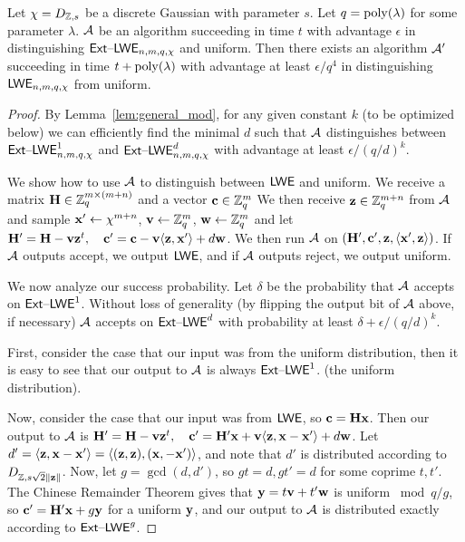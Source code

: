 \begin{theorem}\label{thm:main_new_extlwe}Let $\chi=D_{\mathbb{Z},s}$ be a
  discrete Gaussian with parameter $s$. Let $q=\operatorname{poly}(\lambda)$ for
  some parameter $\lambda$.
  $\mathcal{A}$ be an algorithm succeeding in time $t$ with advantage $\epsilon$ in
  distinguishing $\mathsf{Ext \text{\textendash} LWE}_{n,m,q,\chi}$ and uniform. Then there exists an algorithm
  $\mathcal{A}'$ succeeding in time $t+\operatorname{poly}(\lambda)$ with advantage at
  least $\epsilon/q^4$ in distinguishing $\mathsf{LWE}_{n,m,q,\chi}$ from uniform.
\end{theorem}
\begin{proof}
  By Lemma~\ref{lem:general_mod}, for any given constant $k$ (to be optimized below) we can efficiently find the minimal $d$ such
  that $\mathcal{A}$ distinguishes between $\mathsf{Ext \text{\textendash} LWE}_{n,m,q,\chi}^{1}$ and
  $\mathsf{Ext \text{\textendash} LWE}_{n,m,q,\chi}^{d}$ with advantage at least
  $\epsilon/(q/d)^k$. 

  We show how to use $\mathcal{A}$ to distinguish between $\mathsf{LWE}$ and
  uniform.  We receive a matrix $\mathbf{H} \in \mathbb{Z}_q^{m \times (m+n)}$
  and a vector $\mathbf{c} \in \mathbb{Z}_q^{m}$  We then
  receive $\mathbf{z} \in \mathbb{Z}_q^{m+n}$ from $\mathcal{A}$ and sample
  $\mathbf{x}' \gets \chi^{m+n}$, $\mathbf{v} \gets \mathbb{Z}_q^{m}$,
  $\mathbf{w} \gets \mathbb{Z}_q^{m}$ and let $\mathbf{H}' = \mathbf{H} - \mathbf{v}\mathbf{z}^t,\quad \mathbf{c}' = \mathbf{c} -
\mathbf{v}\langle\mathbf{z},\mathbf{x}'\rangle+d\mathbf{w}$. We then run $\mathcal{A}$ on $(\mathbf{H}',
\mathbf{c}',\mathbf{z},\langle\mathbf{x}',\mathbf{z}\rangle)$. If $\mathcal{A}$ outputs accept, we output
$\mathsf{LWE}$, and if $\mathcal{A}$ outputs reject, we output uniform.


We now analyze our success probability. Let $\delta$ be the
probability that $\mathcal{A}$ accepts on $\mathsf{Ext \text{\textendash} LWE}^{1}$.  Without loss of
generality (by flipping the output bit of $\mathcal{A}$ above, if necessary) $\mathcal{A}$ accepts
on $\mathsf{Ext \text{\textendash} LWE}^{d}$ with probability at least $\delta+\epsilon/(q/d)^k$.

First, consider the case that our input was from the uniform distribution, then it is easy
to see that our output to $\mathcal{A}$ is always $\mathsf{Ext \text{\textendash} LWE}^{1}$. (the uniform
distribution).


Now, consider the case that our input was from $\mathsf{LWE}$, so $\mathbf{c}=\mathbf{H}\mathbf{x}$. Then our output
to $\mathcal{A}$ is 
$\mathbf{H}'=\mathbf{H}-\mathbf{v}\mathbf{z}^t,\quad \mathbf{c}'=\mathbf{H}'\mathbf{x}+\mathbf{v}\langle\mathbf{z},\mathbf{x}-\mathbf{x}'\rangle+d\mathbf{w}$.
Let
$d'=\langle\mathbf{z},\mathbf{x}-\mathbf{x}'\rangle=\langle(\mathbf{z},\mathbf{z}),(\mathbf{x},-\mathbf{x}')\rangle$,
and note that $d'$ is distributed according to $D_{\mathbb{Z},s\sqrt{2}\lVert\mathbf{z}\rVert}$.
Now,  let $g=\gcd(d,d')$, so
$gt=d, gt'=d$ for some coprime $t,t'$. The
Chinese Remainder Theorem gives that $\mathbf{y}=t\mathbf{v}+t'\mathbf{w}$ is uniform $\bmod{q/g}$,
so $\mathbf{c}'=\mathbf{H}'\mathbf{x}+g\mathbf{y}$ for a uniform $\mathbf{y}$, and our output to $\mathcal{A}$ is
distributed exactly according to
$\mathsf{Ext \text{\textendash} LWE}^{g}$. 


\end{proof}
